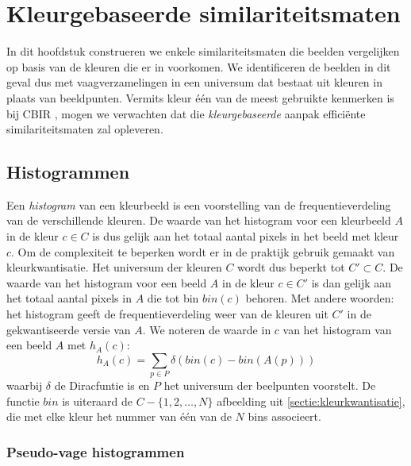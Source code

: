 \chapter{Kleurgebaseerde similariteitsmaten}

In dit hoofdstuk construeren we enkele similariteitsmaten die beelden 
vergelijken op basis van de kleuren die er in voorkomen. We identificeren de beelden
in dit geval dus met vaagverzamelingen in een universum dat bestaat uit kleuren 
in plaats van beeldpunten. Vermits kleur \'e\'en  van de meest gebruikte kenmerken is bij CBIR 
\cite{rui:image_retr, schettini:survey_of_methods_for_colour_image_indexing_and_retrieval}, mogen we 
verwachten dat die \emph{kleurgebaseerde} aanpak effici\"ente 
similariteitsmaten zal opleveren. 

\section{Histogrammen}

Een \emph{histogram} van een kleurbeeld is een voorstelling van de frequentieverdeling 
van de verschillende kleuren. De waarde van het histogram voor een kleurbeeld 
$A$ in de kleur $c \in C$ is dus gelijk aan het totaal aantal pixels in het beeld met 
kleur $c$. Om de complexiteit te beperken wordt er in de praktijk gebruik gemaakt
van kleurkwantisatie. Het universum der kleuren $C$ wordt dus beperkt tot $C' \subset C$. 
De waarde van het histogram voor een beeld $A$ in de kleur $c \in C'$ is dan gelijk aan 
het totaal aantal pixels in $A$ die tot bin $bin(c)$ behoren. Met andere woorden: het histogram 
geeft de frequentieverdeling weer van de kleuren uit $C'$ in de gekwantiseerde versie van 
$A$. We noteren de waarde in $c$ van het histogram van een beeld $A$ met $h_A(c)$: 
\begin{displaymath}
h_A(c) = \sum_{p \in P} \delta (bin(c) - bin(A(p))) 
\end{displaymath} 
waarbij $\delta$ de Diracfuntie is en $P$ het universum der beelpunten 
voorstelt. De functie $bin$ is uiteraard de $C - \{1,2,\ldots,N\}$ afbeelding 
uit \ref{sectie:kleurkwantisatie}, die met 
elke kleur het nummer van \'e\'en van de $N$ bins associeert. 


\subsection{Pseudo-vage histogrammen}

